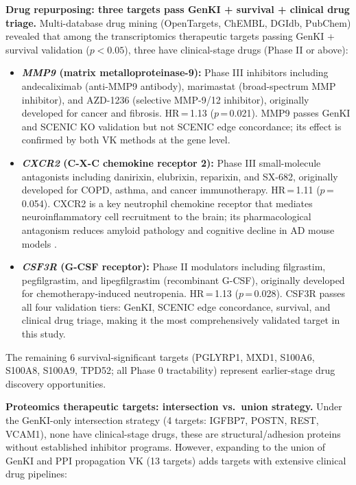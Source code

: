 \documentclass[12pt,a4paper]{article}
\begin{document}
\textbf{Drug repurposing: three targets pass GenKI + survival + clinical drug triage.}
Multi-database drug mining (OpenTargets, ChEMBL, DGIdb, PubChem) revealed that among the transcriptomics therapeutic targets passing GenKI + survival validation ($p < 0.05$), three have clinical-stage drugs (Phase II or above):
\begin{itemize}
\item \textbf{\textit{MMP9} (matrix metalloproteinase-9):} Phase III inhibitors including andecaliximab (anti-MMP9 antibody), marimastat (broad-spectrum MMP inhibitor), and AZD-1236 (selective MMP-9/12 inhibitor), originally developed for cancer and fibrosis. HR\,=\,1.13 ($p$\,=\,0.021). MMP9 passes GenKI and SCENIC KO validation but not SCENIC edge concordance; its effect is confirmed by both VK methods at the gene level.
\item \textbf{\textit{CXCR2} (C-X-C chemokine receptor 2):} Phase III small-molecule antagonists including danirixin, elubrixin, reparixin, and SX-682, originally developed for COPD, asthma, and cancer immunotherapy. HR\,=\,1.11 ($p$\,=\,0.054). CXCR2 is a key neutrophil chemokine receptor that mediates neuroinflammatory cell recruitment to the brain; its pharmacological antagonism reduces amyloid pathology and cognitive decline in AD mouse models \citep{bakshi2011, ryu2015}.
\item \textbf{\textit{CSF3R} (G-CSF receptor):} Phase II modulators including filgrastim, pegfilgrastim, and lipegfilgrastim (recombinant G-CSF), originally developed for chemotherapy-induced neutropenia. HR\,=\,1.13 ($p$\,=\,0.028). CSF3R passes all four validation tiers: GenKI, SCENIC edge concordance, survival, and clinical drug triage, making it the most comprehensively validated target in this study.
\end{itemize}
The remaining 6 survival-significant targets (PGLYRP1, MXD1, S100A6, S100A8, S100A9, TPD52; all Phase 0 tractability) represent earlier-stage drug discovery opportunities.

\textbf{Proteomics therapeutic targets: intersection vs.\ union strategy.}
Under the GenKI-only intersection strategy (4 targets: IGFBP7, POSTN, REST, VCAM1), none have clinical-stage drugs, these are structural/adhesion proteins without established inhibitor programs. However, expanding to the union of GenKI and PPI propagation VK (13 targets) adds targets with extensive clinical drug pipelines:
\end{document}
